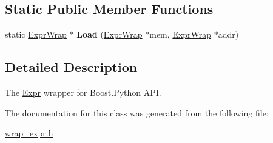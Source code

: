 \subsection*{Static Public Member Functions}
\begin{DoxyCompactItemize}
\item 
\mbox{\label{classilang_1_1pyapi_1_1_expr_wrap_af227f38837f227fc94fe6ec9edc004b1}} 
static \mbox{\hyperlink{classilang_1_1pyapi_1_1_expr_wrap}{Expr\+Wrap}} $\ast$ {\bfseries Load} (\mbox{\hyperlink{classilang_1_1pyapi_1_1_expr_wrap}{Expr\+Wrap}} $\ast$mem, \mbox{\hyperlink{classilang_1_1pyapi_1_1_expr_wrap}{Expr\+Wrap}} $\ast$addr)
\end{DoxyCompactItemize}


\subsection{Detailed Description}
The \mbox{\hyperlink{classilang_1_1_expr}{Expr}} wrapper for Boost.\+Python A\+PI. 

The documentation for this class was generated from the following file\+:\begin{DoxyCompactItemize}
\item 
\mbox{\hyperlink{wrap__expr_8h}{wrap\+\_\+expr.\+h}}\end{DoxyCompactItemize}
